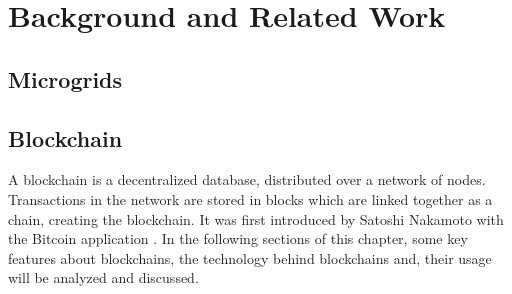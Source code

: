 \chapter{Background and Related Work}
\section{Microgrids}




\section{Blockchain}
A blockchain is a decentralized database, distributed over a network of nodes. Transactions in the network are stored in blocks which are linked together as a chain, creating the blockchain. It was first introduced by Satoshi Nakamoto with the Bitcoin application \cite{Nakamoto_bitcoin}.
In the following sections of this chapter, some key features about blockchains, the technology behind blockchains and, their usage will be analyzed and discussed. 

